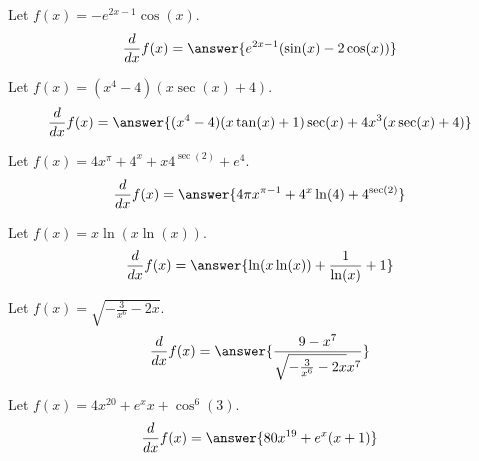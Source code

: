 \documentclass{ximera}
\begin{document}
\begin{shuffle}
\begin{exercise}
Let $f(x)=-e^{2 x-1} \cos (x)$.
\[
\ddx f(x) = \answer{e^{2 x-1} (\sin (x)-2 \cos (x))}
\]
\end{exercise}


\begin{exercise}
Let $f(x)=(x^4-4) (x \sec (x)+4)$.
\[
\ddx f(x) = \answer{(x^4-4) (x \tan (x)+1) \sec (x)+4 x^3 (x \sec (x)+4)}
\]
\end{exercise}

\begin{exercise}
Let $f(x)=4 x^{\pi }+4^x+x 4^{\sec (2)}+e^4$.
\[
\ddx f(x) = \answer{4 \pi  x^{\pi -1}+4^x \ln (4)+4^{\sec (2)}}
\]
\end{exercise}



\begin{exercise}
Let $f(x)=x \ln (x \ln (x))$.
\[
\ddx f(x) = \answer{\ln (x \ln (x))+\frac{1}{\ln (x)}+1}
\]
\end{exercise}

\begin{exercise}
Let $f(x)=\sqrt{-\frac{3}{x^6}-2 x}$.
\[
\ddx f(x) = \answer{\frac{9-x^7}{\sqrt{-\frac{3}{x^6}-2 x} x^7}}
\]
\end{exercise}

\begin{exercise}
Let $f(x)=4 x^{20}+e^x x+\cos ^6(3)$.
\[
\ddx f(x) = \answer{80 x^{19}+e^x (x+1)}
\]
\end{exercise}


\end{shuffle}
\end{document}
